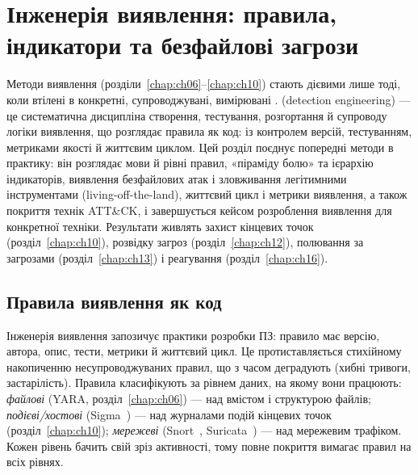 \chapter{Інженерія виявлення: правила, індикатори та безфайлові загрози}
\label{chap:ch11}

Методи виявлення (розділи~\ref{chap:ch06}--\ref{chap:ch10}) стають дієвими лише тоді, коли втілені в конкретні, супроводжувані, вимірювані .  (detection engineering) --- це систематична дисципліна створення, тестування, розгортання й супроводу логіки виявлення, що розглядає правила як код: із контролем версій, тестуванням, метриками якості й життєвим циклом. Цей розділ поєднує попередні методи в практику: він розглядає мови й рівні правил, «піраміду болю» та ієрархію індикаторів, виявлення безфайлових атак і зловживання легітимними інструментами (living-off-the-land), життєвий цикл і метрики виявлення, а також покриття технік ATT\&CK, і завершується кейсом розроблення виявлення для конкретної техніки. Результати живлять захист кінцевих точок (розділ~\ref{chap:ch10}), розвідку загроз (розділ~\ref{chap:ch12}), полювання за загрозами (розділ~\ref{chap:ch13}) і реагування (розділ~\ref{chap:ch16}).

\section{Правила виявлення як код}\label{sec:ch11-rules}

Інженерія виявлення запозичує практики розробки ПЗ: правило має версію, автора, опис, тести, метрики й життєвий цикл. Це протиставляється стихійному накопиченню несупроводжуваних правил, що з часом деградують (хибні тривоги, застарілість). Правила класифікують за рівнем даних, на якому вони працюють: \emph{файлові} (YARA, розділ~\ref{chap:ch06}) --- над вмістом і структурою файлів; \emph{подієві/хостові} (Sigma~\cite{sigma}) --- над журналами подій кінцевих точок (розділ~\ref{chap:ch10}); \emph{мережеві} (Snort~\cite{ch11:snort}, Suricata~\cite{ch11:suricata}) --- над мережевим трафіком. Кожен рівень бачить свій зріз активності, тому повне покриття вимагає правил на всіх рівнях.

\begin{tikzfig}
\end{tikzfig}

